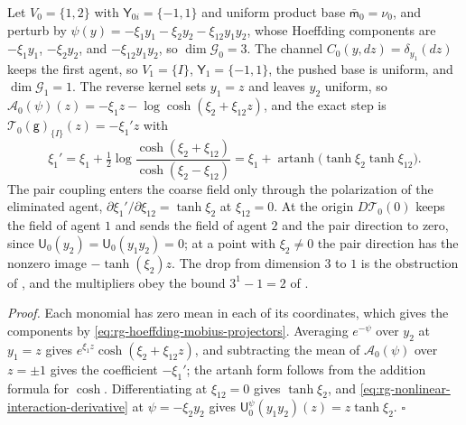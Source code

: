 Let $V_0=\{1,2\}$ with $\mathsf Y_{0i}=\{-1,1\}$ and uniform product base
$\bar{\mathsf m}_0=\nu_0$, and perturb by
$\psi(y)=-\xi_1y_1-\xi_2y_2-\xi_{12}y_1y_2$, whose Hoeffding components are
$-\xi_1y_1$, $-\xi_2y_2$, and $-\xi_{12}y_1y_2$, so $\dim\mathcal G_0=3$. The
channel $C_0(y,dz)=\delta_{y_1}(dz)$ keeps the first agent, so $V_1=\{I\}$,
$\mathsf Y_1=\{-1,1\}$, the pushed base is uniform, and $\dim\mathcal G_1=1$. The
reverse kernel sets $y_1=z$ and leaves $y_2$ uniform, so
$\mathcal A_0(\psi)(z)=-\xi_1z-\log\cosh(\xi_2+\xi_{12}z)$, and the exact step is
$\mathcal T_0(\mathsf g)_{\{I\}}(z)=-\xi_1'z$ with
\[
\xi_1'=\xi_1+\tfrac12\log\frac{\cosh(\xi_2+\xi_{12})}{\cosh(\xi_2-\xi_{12})}
=\xi_1+\operatorname{artanh}\bigl(\tanh\xi_2\tanh\xi_{12}\bigr).
\]
The pair coupling enters the coarse field only through the polarization of the
eliminated agent, $\partial\xi_1'/\partial\xi_{12}=\tanh\xi_2$ at $\xi_{12}=0$. At
the origin $D\mathcal T_0(0)$ keeps the field of agent $1$ and sends the field of
agent $2$ and the pair direction to zero, since
$\mathsf U_0(y_2)=\mathsf U_0(y_1y_2)=0$; at a point with $\xi_2\ne0$ the pair
direction has the nonzero image $-\tanh(\xi_2)z$. The drop from dimension $3$ to
$1$ is the obstruction of ,
and the multipliers obey the bound $3^1-1=2$ of
. 

\noindent\emph{Proof.}
Each monomial has zero mean in each of its coordinates, which gives the components
by \eqref{eq:rg-hoeffding-mobius-projectors}. Averaging $e^{-\psi}$ over $y_2$ at
$y_1=z$ gives $e^{\xi_1z}\cosh(\xi_2+\xi_{12}z)$, and subtracting the mean of
$\mathcal A_0(\psi)$ over $z=\pm1$ gives the coefficient $-\xi_1'$; the artanh form
follows from the addition formula for $\cosh$. Differentiating at $\xi_{12}=0$
gives $\tanh\xi_2$, and \eqref{eq:rg-nonlinear-interaction-derivative} at
$\psi=-\xi_2y_2$ gives $\mathsf U_0^{\psi}(y_1y_2)(z)=z\tanh\xi_2$. $\square$


